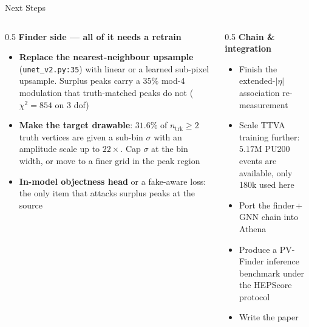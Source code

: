 \documentclass[xcolor=table,aspectratio=169]{beamer}
\newcommand{\ntrk}{\ensuremath{n_\mathrm{trk}}}
\begin{document}
\begin{frame}[shrink=15]{Next Steps}
    \begin{columns}[t]
        \begin{column}{0.5\linewidth}
            \textbf{Finder side --- all of it needs a retrain}
            \begin{itemize}
                \setlength\itemsep{0.4em}
                \item \textbf{Replace the nearest-neighbour upsample}
                    (\texttt{unet\_v2.py:35}) with linear or a learned sub-pixel
                    upsample. Surplus peaks carry a $35\%$ mod-4 modulation that
                    truth-matched peaks do not ($\chi^2 = 854$ on 3 dof)
                \item \textbf{Make the target drawable}: $31.6\%$ of $\ntrk\geq2$
                    truth vertices are given a sub-bin $\sigma$ with an amplitude
                    scale up to $22\times$. Cap $\sigma$ at the bin width, or move to
                    a finer grid in the peak region
                \item \textbf{In-model objectness head} or a fake-aware loss: the only
                    item that attacks surplus peaks at the source
            \end{itemize}
        \end{column}
        \begin{column}{0.5\linewidth}
            \textbf{Chain \& integration}
            \begin{itemize}
                \setlength\itemsep{0.5em}
                \item Finish the extended-$|\eta|$ association re-measurement
                \item Scale TTVA training further: $5.17$M PU200 events are available, only 180k used here
                \item Port the finder\,+\,GNN chain into Athena
                \item Produce a PV-Finder inference benchmark under the HEPScore protocol
                \item Write the paper
            \end{itemize}
        \end{column}
    \end{columns}
\end{frame}
\end{document}
